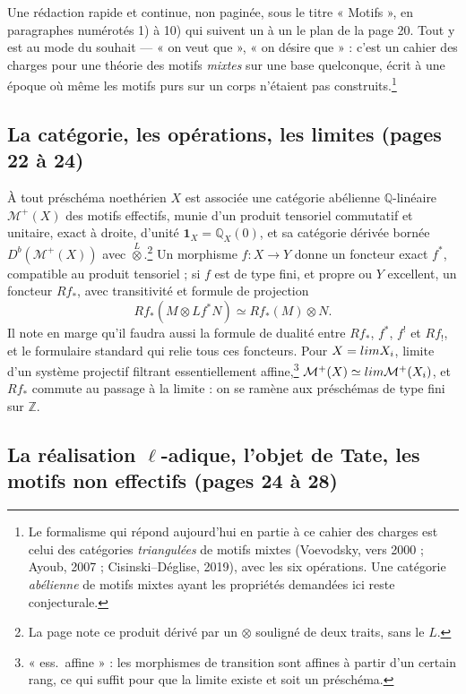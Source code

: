 \documentclass[11pt,a4paper]{article}
\begin{document}
Une rédaction rapide et continue, non paginée, sous le titre « Motifs », en
paragraphes numérotés 1) à 10) qui suivent un à un le plan de la page 20. Tout y
est au mode du souhait --- « on veut que », « on désire que » : c'est un cahier
des charges pour une théorie des motifs \emph{mixtes} sur une base quelconque,
écrit à une époque où même les motifs purs sur un corps n'étaient pas
construits.\footnote{Le formalisme qui répond aujourd'hui en partie à ce cahier
des charges est celui des catégories \emph{triangulées} de motifs mixtes
(Voevodsky, vers 2000 ; Ayoub, 2007 ; Cisinski--Déglise, 2019), avec les six
opérations. Une catégorie \emph{abélienne} de motifs mixtes ayant les propriétés
demandées ici reste conjecturale.}

\subsection*{La catégorie, les opérations, les limites (pages 22 à 24)}

À tout préschéma noethérien $X$ est associée une catégorie abélienne
$\mathbb{Q}$-linéaire $\mathcal{M}^{+}(X)$ des motifs effectifs, munie d'un
produit tensoriel commutatif et unitaire, exact à droite, d'unité
$\mathbf{1}_{X} = \mathbb{Q}_{X}(0)$, et sa catégorie dérivée bornée
$D^{b}(\mathcal{M}^{+}(X))$ avec $\overset{L}{\otimes}$.\footnote{La page note
ce produit dérivé par un $\otimes$ souligné de deux traits, sans le $L$.} Un morphisme
$f \colon X \to Y$ donne un foncteur exact $f^{*}$, compatible au produit
tensoriel ; si $f$ est de type fini, et propre ou $Y$ excellent, un foncteur
$Rf_{*}$, avec transitivité et formule de projection
\[
Rf_{*}(M \otimes Lf^{*}N) \simeq Rf_{*}(M) \otimes N .
\]
Il note en marge qu'il faudra aussi la formule de dualité entre $Rf_{*}$,
$f^{*}$, $f^{!}$ et $Rf_{!}$, et le formulaire standard qui relie tous ces
foncteurs. Pour $X = \varprojlim X_{i}$, limite d'un système projectif filtrant
essentiellement affine,\footnote{« ess.\ affine » : les morphismes de transition
sont affines à partir d'un certain rang, ce qui suffit pour que la limite
existe et soit un préschéma.} $\mathcal{M}^{+}(X) \simeq \varinjlim \mathcal{M}^{+}(X_{i})$,
et $Rf_{*}$ commute au passage à la limite : on se ramène aux préschémas de type
fini sur $\mathbb{Z}$.

\subsection*{La réalisation $\ell$-adique, l'objet de Tate, les motifs non effectifs (pages 24 à 28)}
\end{document}
